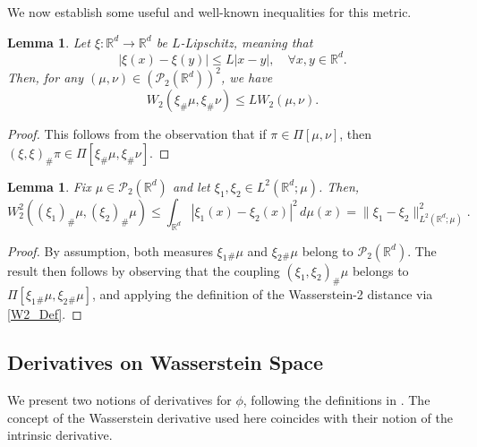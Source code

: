\documentclass[11pt,a4paper]{amsart}
\newcommand{\1}{\mathds{1}}
\newtheorem{lemma}[theorem]{\textbf{Lemma}}
\numberwithin{equation}{section}
\begin{document}
\smallskip

We now establish some useful and well-known inequalities for this metric.

\begin{lemma}  \label{lipschitz_control}
Let $\xi : \mathbb{R}^d \rightarrow \mathbb{R}^d$ be $L$-Lipschitz, meaning that
\[
|\xi(x) - \xi(y)| \leq L|x - y|, \quad \forall x, y \in \mathbb{R}^d.
\]
Then, for any $(\mu, \nu) \in (\mathcal{P}_{2}(\mathbb{R}^d))^2$, we have
\[
W_2(\xi_{\#} \mu, \xi_{\#} \nu) \leq L W_2(\mu, \nu).
\]
\end{lemma}

\begin{proof}
This follows from the observation that if $\pi \in \Pi[\mu, \nu]$, then $(\xi, \xi)_{\#} \pi \in \Pi[\xi_{\#} \mu, \xi_{\#} \nu]$.
\end{proof}

\begin{lemma} \label{same_measure_bound}
Fix $\mu \in \mathcal{P}_2(\mathbb{R}^d)$ and let $\xi_1, \xi_2 \in L^2(\mathbb{R}^d; \mu)$. Then,
\[
W_2^2((\xi_1)_{\#} \mu, (\xi_2)_{\#} \mu) 
\leq \int_{\mathbb{R}^d} |\xi_1(x) - \xi_2(x)|^2 \, d\mu(x) 
= \|\xi_1 - \xi_2\|^2_{L^2(\mathbb{R}^d; \mu)}.
\]
\end{lemma}


\begin{proof}
By assumption, both measures $\xi_1{}_{\#} \mu$ and $\xi_2{}_{\#} \mu$ belong to $\mathcal{P}_2(\mathbb{R}^d)$. The result then follows by observing that the coupling $(\xi_1, \xi_2)_{\#} \mu$ belongs to $\Pi[\xi_1{}_{\#} \mu, \xi_2{}_{\#} \mu]$, and applying the definition of the Wasserstein-2 distance via \eqref{W2_Def}.
\end{proof}



\subsection{Derivatives on Wasserstein Space} \label{calculus_Wasserstein}

We present two notions of derivatives for $\phi$, following the definitions in \cite[Section 2]{cardaliaguet2019master}. The concept of the Wasserstein derivative used here coincides with their notion of the intrinsic derivative.

\smallskip
\end{document}
